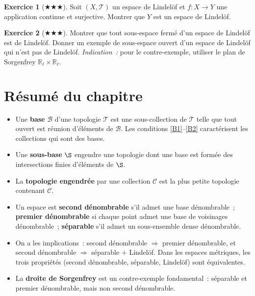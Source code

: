 \documentclass[12pt,a4paper,openany]{book}
\theoremstyle{definition}
\theoremstyle{cours}
\theoremstyle{coursnormal}
\newtheorem{exercice}{Exercice}[chapter]
\newcommand{\R}{\mathbb{R}}
\newcommand{\T}{\mathcal{T}}
\newcommand{\B}{\mathcal{B}}
\begin{document}
\begin{exercice}[$\bigstar\bigstar\bigstar$]
  Soit $(X,\T)$ un espace de Lindelöf et $f\colon X\to Y$ une application
  continue et surjective. Montrer que $Y$ est un espace de Lindelöf.
\end{exercice}

\begin{exercice}[$\bigstar\bigstar\bigstar$]
  Montrer que tout sous-espace fermé d'un espace de Lindelöf est de Lindelöf.
  Donner un exemple de sous-espace ouvert d'un espace de Lindelöf qui n'est
  pas de Lindelöf.
  \emph{Indication~:} pour le contre-exemple, utiliser le plan de Sorgenfrey
  $\R_\ell\times\R_\ell$.
\end{exercice}

\section*{Résumé du chapitre}

\begin{itemize}
  \item Une \textbf{base} $\B$ d'une topologie $\T$ est une sous-collection de
    $\T$ telle que tout ouvert est réunion d'éléments de $\B$. Les conditions
    \ref{B1}--\ref{B2} caractérisent les collections qui sont des bases.
  \item Une \textbf{sous-base} $\S$ engendre une topologie dont une base est
    formée des intersections finies d'éléments de $\S$.
  \item La \textbf{topologie engendrée} par une collection $\mathcal{C}$ est la
    plus petite topologie contenant $\mathcal{C}$.
  \item Un espace est \textbf{second dénombrable} s'il admet une base
    dénombrable~; \textbf{premier dénombrable} si chaque point admet une base
    de voisinages dénombrable~; \textbf{séparable} s'il admet un sous-ensemble
    dense dénombrable.
  \item On a les implications~: second dénombrable
    $\Rightarrow$ premier dénombrable, et second dénombrable $\Rightarrow$
    séparable $+$ Lindelöf. Dans les espaces métriques, les trois propriétés
    (second dénombrable, séparable, Lindelöf) sont équivalentes.
  \item La \textbf{droite de Sorgenfrey} est un contre-exemple fondamental~:
    séparable et premier dénombrable, mais non second dénombrable.
\end{itemize}
\end{document}
